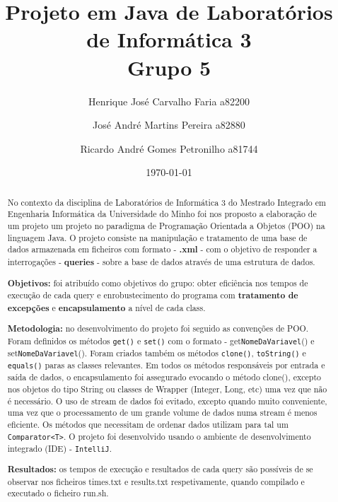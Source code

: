 \documentclass[11pt,a4paper]{article}
\begin{document}
\title{Projeto em Java de Laboratórios de Informática 3\\Grupo 5}
\author{Henrique José Carvalho Faria a82200\and José André Martins Pereira a82880 \and Ricardo André Gomes Petronilho a81744}
\date{\today}


\maketitle
\newpage

\begin{abstract}

No contexto da disciplina de Laboratórios de Informática 3 do Mestrado Integrado em Engenharia Informática da Universidade do Minho
foi nos proposto a elaboração de um projeto um projeto no paradigma de Programação Orientada a Objetos (POO) na linguagem Java.
O projeto consiste na manipulação e tratamento de uma base de dados armazenada em ficheiros com formato - \textbf{.xml} - com o objetivo
de responder a interrogações - \textbf{queries} - sobre a base de dados através de uma estrutura de dados.\newline

\textbf{Objetivos:} foi atribuído como objetivos do grupo: obter eficiência nos tempos de execução de cada query e
enrobustecimento do programa com \textbf{tratamento de excepções} e \textbf{encapsulamento} a nível de cada class.\newline

\textbf{Metodologia:} no desenvolvimento do projeto foi seguido as convenções de POO. Foram definidos os métodos \texttt{get()} e \texttt{set()}
com o formato - get\texttt{NomeDaVariavel}() e set\texttt{NomeDaVariavel}(). Foram criados também os métodos \texttt{clone()}, \texttt{toString()} e \texttt{equals()} paras
as classes relevantes. Em todos os métodos responsáveis por entrada e saída de dados, o encapsulamento foi assegurado
evocando o método clone(), excepto nos objetos do tipo String ou classes de Wrapper (Integer, Long, etc) uma vez que
não é necessário. O uso de stream de dados foi evitado, excepto quando muito conveniente, uma vez que o processamento de um grande volume
de dados numa stream é menos eficiente. Os métodos que necessitam de ordenar dados utilizam para tal um \texttt{Comparator<T>}.
O projeto foi desenvolvido usando o ambiente de desenvolvimento integrado (IDE) - \texttt{IntelliJ}.\newline

\textbf{Resultados:} os tempos de execução e resultados de cada query são possíveis de se observar nos ficheiros times.txt e results.txt respetivamente, quando compilado e executado
o ficheiro run.sh.\newline


\end{abstract}
\end{document}

